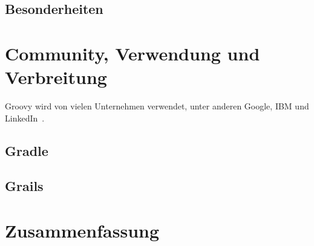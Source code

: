 \documentclass[11pt,a4paper]{article}
\title{\paperTitle}
\author{\paperAuthor}
\date{\paperDate}
\begin{document}
	\subsection{Besonderheiten}\label{subsec:besonderheiten}


	\section{Community, Verwendung und Verbreitung}\label{sec:community}

	Groovy wird von vielen Unternehmen verwendet, unter anderen Google, IBM und LinkedIn~\cite{GroovyLangOrg,wiki:Groovy}.

	\subsection{Gradle}\label{subsec:gradle}

	\subsection{Grails}\label{subsec:grails}


	\section{Zusammenfassung}\label{sec:zusammenfassung}


	
	

\end{document}
